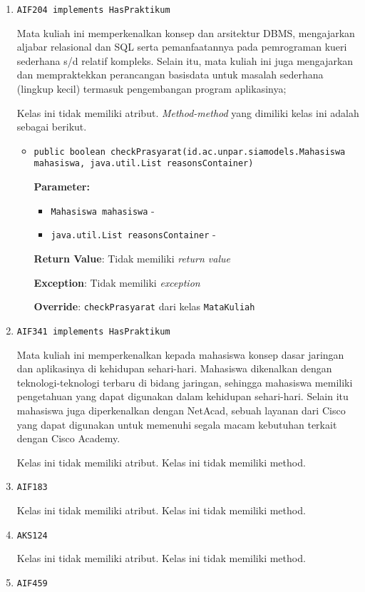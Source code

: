 \documentclass{article}
\begin{document}
\begin{enumerate}
\item \texttt{AIF204 implements HasPraktikum}

Mata kuliah ini memperkenalkan konsep dan arsitektur DBMS, mengajarkan 
 aljabar relasional dan SQL serta pemanfaatannya pada pemrograman kueri 
 sederhana s/d relatif kompleks. Selain itu, mata kuliah ini juga mengajarkan 
 dan mempraktekkan perancangan basisdata untuk masalah sederhana 
 (lingkup kecil) termasuk pengembangan program aplikasinya;

Kelas ini tidak memiliki atribut. \textit{Method-method} yang dimiliki kelas ini adalah sebagai berikut.
\begin{itemize}
\item \texttt{public boolean checkPrasyarat(id.ac.unpar.siamodels.Mahasiswa mahasiswa, java.util.List reasonsContainer)}

\textbf{Parameter:}
\begin{itemize}
\item \texttt{Mahasiswa mahasiswa} - 
\item \texttt{java.util.List reasonsContainer} - 
\end{itemize}
\textbf{Return Value}: Tidak memiliki \textit{return value}

\textbf{Exception}: Tidak memiliki \textit{exception}

\textbf{Override}: \texttt{checkPrasyarat} dari kelas \texttt{MataKuliah}

\end{itemize}
\item \texttt{AIF341 implements HasPraktikum}

Mata kuliah ini memperkenalkan kepada mahasiswa konsep dasar 
 jaringan dan aplikasinya di kehidupan sehari-hari. Mahasiswa 
 dikenalkan dengan teknologi-teknologi terbaru di bidang jaringan, 
 sehingga mahasiswa memiliki pengetahuan yang dapat digunakan 
 dalam kehidupan sehari-hari. Selain itu mahasiswa juga 
 diperkenalkan dengan NetAcad, sebuah layanan dari Cisco yang 
 dapat digunakan untuk memenuhi segala macam kebutuhan terkait 
 dengan Cisco Academy.

Kelas ini tidak memiliki atribut. Kelas ini tidak memiliki method. \item \texttt{AIF183}



Kelas ini tidak memiliki atribut. Kelas ini tidak memiliki method. \item \texttt{AKS124}



Kelas ini tidak memiliki atribut. Kelas ini tidak memiliki method. \item \texttt{AIF459}




\end{enumerate}
\end{document}
